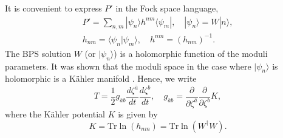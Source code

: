\documentclass[a4paper,12pt]{article}
\begin{document}
It is convenient to express $P'$ in the Fock space language,
\begin{gather}
P'=\sum_{n,m}|\psi_n\rangle h^{nm} \langle\psi_m|,\quad |\psi_n\rangle=W|n\rangle,\\
h_{nm}=\langle\psi_n|\psi_m\rangle,\quad h^{nm}=(h_{nm})^{-1}.
\end{gather}
The BPS solution $W$ (or $|\psi_n\rangle$) is a holomorphic function of the moduli parameters.
It was shown that the moduli space in the case where $|\psi_n\rangle$ is holomorphic 
is a K\"ahler manifold \cite{GMS}. Hence, we write
\begin{equation}
T=\frac{1}{2}g_{\bar{a}b}\frac{d\zeta^{\bar{a}}}{dt}\frac{d\zeta^b}{dt},
\quad g_{\bar{a}b}=\frac{\partial}{\partial\zeta^{\bar{a}}}\frac{\partial}{\partial\zeta^b}K,
\end{equation}
where the K\"ahler potential $K$ is given by
\begin{equation}
K=\mbox{Tr}\ln(h_{nm})=\mbox{Tr}\ln(W^\dag W)\label{K}.
\end{equation}
\end{document}
